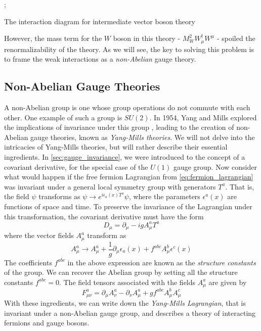 \begin{marginfigure}
;
\caption{The interaction diagram for intermediate vector boson theory}
\end{marginfigure}
However, the mass term for the $W$ boson in this theory - $M_W^2W_\mu^\dagger W^\mu$ - spoiled the renormalizability of the theory. As we will see, the key to solving this problem is to frame the weak interactions as a \emph{non-Abelian} gauge theory. 

\subsection{Non-Abelian Gauge Theories}\label{subsec:non_abelian}
A non-Abelian group is one whose group operations do not commute with each other. One example of such a group is $SU(2)$. In 1954, Yang and Mills explored the implications of invariance under this group \citep{Yang1954}, leading to the creation of non-Abelian gauge theories, known as \emph{Yang-Mills theories}. 
We will not delve into the intricacies of Yang-Mills theories, but will rather describe their essential ingredients. In \autoref{sec:gauge_invariance}, we were introduced to the concept of a covariant derivative, for the special case of the $U(1)$ gauge group. Now consider what would happen if the free fermion Lagrangian from \eqref{eq:fermion_lagrangian} was invariant under a general local symmetry group with generators $T^a$. That is, the field $\psi$ transforms as $\psi\rightarrow e^{i\epsilon_a(x) T^a}\psi$, where the parameters $\epsilon^a(x)$ are functions of space and time. To preserve the invariance of the Lagrangian under this transformation, the covariant derivative must have the form 
$$D_\mu = \partial_\mu - igA_\mu^aT^a$$
where the vector fields $A_\mu^a$ transform as 
$$A_\mu^a\rightarrow A_\mu^a + \frac{1}{g}\partial_\mu\epsilon_a(x) + f^{abc}A_\mu^b\epsilon^c(x)$$ 
The coefficients $f^{abc}$ in the above expression are known as the \emph{structure constants} of the group. We can recover the Abelian group by setting all the structure constants $f^{abc} = 0$. The field tensors associated with the fields $A_\mu^a$ are given by
$$F_{\mu\nu}^a = \partial_\mu A_\nu^a - \partial_\nu A_\mu^a + gf^{abc}A_\mu^b A_\mu^c$$
With these ingredients, we can write down the \emph{Yang-Mills Lagrangian}, that is invariant under a non-Abelian gauge group, and describes a theory of interacting fermions and gauge bosons.
